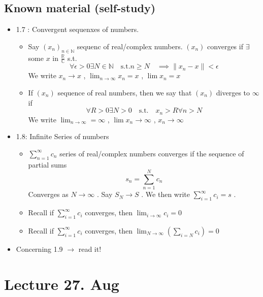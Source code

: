 \documentclass{article}
\theoremstyle{remark}
\begin{document}
   
 \subsection{Known material (self-study)}%
 \label{sub:known_material_self_study_}
 \begin{itemize}
   \item 1.7 :  Convergent sequenxes of numbers.
     \begin{itemize}
       \item Say $\left( x_{n} \right)_{n \in \mathbb{N} } $ sequenc of real/complex numbers. $\left( x_{n} \right)$ converges if $\exists$ some $x$ in $  \frac{\mathbb{R} }{\mathbb{C} } $ s.t. \[
       \forall \epsilon > 0 \exists N \in  \mathbb{N}  \quad \text{s.t.} n \ge N \quad  \implies  \|x_{n} - x \| < \epsilon   
       \] 
       We write $x_{n} \to  x$ , $\lim _{n \to  \infty} x_{n} = x$ , $\lim x_{n} = x$ 
     \item If $\left( x_{n} \right)$ sequence of real numbers, then we say that $\left( x_{n} \right) $ diverges to $\infty$ if \[
     \forall R > 0 \exists N> 0 \quad \text{s.t.} \quad  x_{n}> R \forall n >N  
     \] 
     We write $\lim_{n\to \infty} = \infty$ , $\lim x_{n} \to  \infty$ , $x_{n} \to  \infty$
     \end{itemize}
   \item 1.8: Infinite Series of numbers
     \begin{itemize}
       \item $\displaystyle \sum_{n= 1}^{\infty}  c_{n}$ series of real/complex numbers converges if the sequence of partial sums \[
       s_{n} = \sum_{n=1}^{N}  c_{n}
       \] 
       Converges as $ N \to  \infty$ . Say $ S_{N} \to  S$ . We then write $\sum_{i=1}^{\infty} c_{i} = s$ . 
     \item Recall if $\sum_{i=1}^{\infty}  c_{i} $ converges, then $\lim _{i \to  \infty} c_{i } = 0$
\item Recall if $\sum_{i=1}^{\infty}  c_{i} $ converges, then $\lim _{N\to \infty} \left( \sum_{i=N}^{} c_{i}  \right) = 0$ 
     \end{itemize}
\item  Concerning 1.9 $\to $ read it!
 \end{itemize}

 \newpage
 \section{Lecture 27. Aug}%
 \label{sec:lecture_27_aug}
\end{document}
